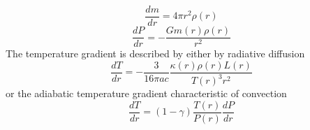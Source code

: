 \begin{equation}
    \frac{dm}{dr} = 4\pi r^2 \rho(r)
\end{equation}
\begin{equation}
    \frac{dP}{dr} = -\frac{G m(r)\rho(r)}{r^2}
\end{equation}
The temperature gradient is described by either by radiative diffusion
\begin{equation}
    \frac{dT}{dr} = -\frac{3}{16\pi ac}\frac{\kappa(r) \rho(r) L(r)}{T(r)^3 r^2}
\end{equation}
or the adiabatic temperature gradient characteristic of convection
\begin{equation}
    \frac{dT}{dr} = (1 - \gamma)\frac{T(r)}{P(r)}\frac{dP}{dr}
\end{equation}